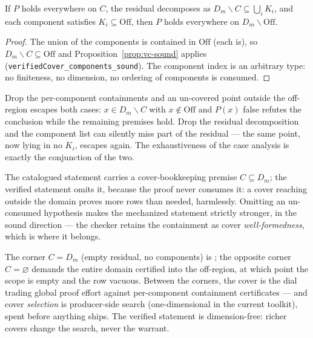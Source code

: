 \begin{bprop}\label{prop:vc-comp}
If $P$ holds everywhere on $C$, the residual decomposes as
$D_m \smallsetminus C \subseteq \bigcup_i K_i$, and each component
satisfies $K_i \subseteq \mathrm{Off}$, then $P$ holds everywhere on
$D_m \smallsetminus \mathrm{Off}$.
\end{bprop}
\begin{proof}
The union of the components is contained in $\mathrm{Off}$ (each is),
so $D_m \smallsetminus C \subseteq \mathrm{Off}$ and
Proposition~\ref{prop:vc-sound} applies
(\texttt{verifiedCover\_components\_sound}). The component index is an
arbitrary type: no finiteness, no dimension, no ordering of components
is consumed.
\end{proof}

\begin{bremark}
Drop the per-component containments and an un-covered point outside
the off-region escapes both cases: $x \in D_m \smallsetminus C$ with
$x \notin \mathrm{Off}$ and $P(x)$ false refutes the conclusion while
the remaining premises hold. Drop the residual decomposition and the
component list can silently miss part of the residual --- the same
point, now lying in no $K_i$, escapes again. The exhaustiveness of the
case analysis is exactly the conjunction of the two.
\end{bremark}

\begin{bremark}
The catalogued statement carries a cover-bookkeeping premise
$C \subseteq D_m$; the verified statement omits it, because the proof
never consumes it: a cover reaching outside the domain proves more
rows than needed, harmlessly. Omitting an un-consumed hypothesis makes
the mechanized statement strictly stronger, in the sound direction ---
the checker retains the containment as cover \emph{well-formedness},
which is where it belongs.
\end{bremark}

\begin{bremark}
The corner $C = D_m$ (empty residual, no components) is
; the opposite corner $C = \varnothing$
demands the entire domain certified into the off-region, at which
point the scope is empty and the row vacuous. Between the corners, the
cover is the dial trading global proof effort against per-component
containment certificates --- and cover \emph{selection} is
producer-side search (one-dimensional in the current toolkit), spent
before anything ships. The verified statement is dimension-free:
richer covers change the search, never the warrant.
\end{bremark}

